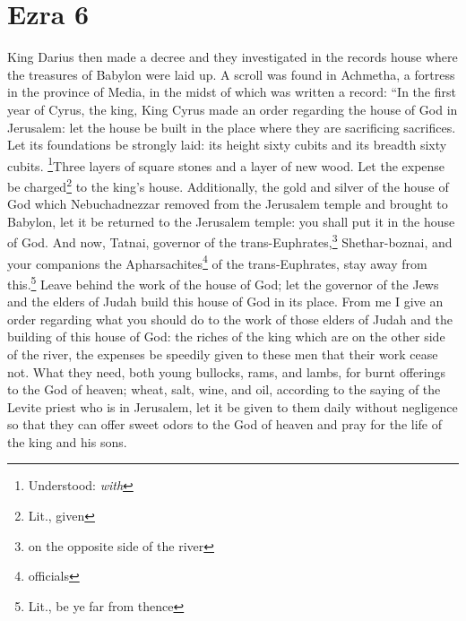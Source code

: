 \section{Ezra 6}\label{Ezra 6}
\begin{enumerate}[align=center]
     King Darius then made a decree and they investigated in the records house where the treasures of Babylon were laid up.%
     A scroll was found in Achmetha, a fortress in the province of Media, in the midst of which was written a record:%
     ``In the first year of Cyrus, the king, King Cyrus made an order regarding the house of God in Jerusalem: let the house be built in the place where they are sacrificing sacrifices. Let its foundations be strongly laid: its height sixty cubits and its breadth sixty cubits.%
     \footnote{Understood: \emph{with}}Three layers of square stones and a layer of new wood. Let the expense be charged\footnote{Lit., given} to the king's house.%
     Additionally, the gold and silver of the house of God which Nebuchadnezzar removed from the Jerusalem temple and brought to Babylon, let it be returned to the Jerusalem temple: you shall put it in the house of God.%
     And now, Tatnai, governor of the trans-Euphrates,\footnote{on the opposite side of the river} Shethar-boznai, and your companions the Apharsachites\footnote{officials} of the trans-Euphrates, stay away from this.\footnote{Lit., be ye far from thence}%
     Leave behind the work of the house of God; let the governor of the Jews and the elders of Judah build this house of God in its place.%
     From me I give an order regarding what you should do to the work of those elders of Judah and the building of this house of God: the riches of the king which are on the other side of the river, the expenses be speedily given to these men that their work cease not.%
     What they need, both young bullocks, rams, and lambs, for burnt offerings to the God of heaven; wheat, salt, wine, and oil, according to the saying of the Levite priest who is in Jerusalem, let it be given to them daily without negligence%
     so that they can offer sweet odors to the God of heaven and pray for the life of the king and his sons.%

\end{enumerate}
